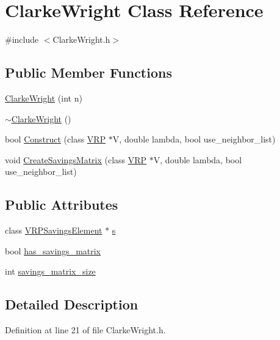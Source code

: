 \hypertarget{class_clarke_wright}{
\section{ClarkeWright Class Reference}
\label{class_clarke_wright}
}


{\ttfamily \#include $<$ClarkeWright.h$>$}

\subsection*{Public Member Functions}
\begin{DoxyCompactItemize}
\item 
\hyperlink{class_clarke_wright_af9e12768a9a93f76ab2b082b83b720ab}{ClarkeWright} (int n)
\item 
\hyperlink{class_clarke_wright_a156fd3e49d76865eb4653d243d5f2439}{$\sim$ClarkeWright} ()
\item 
bool \hyperlink{class_clarke_wright_ac99cbc055fc8f3210b0882c114858e3c}{Construct} (class \hyperlink{class_v_r_p}{VRP} $\ast$V, double lambda, bool use\_\-neighbor\_\-list)
\item 
void \hyperlink{class_clarke_wright_ab8dfbbf8b0b730fa7d851eabba9da1ac}{CreateSavingsMatrix} (class \hyperlink{class_v_r_p}{VRP} $\ast$V, double lambda, bool use\_\-neighbor\_\-list)
\end{DoxyCompactItemize}
\subsection*{Public Attributes}
\begin{DoxyCompactItemize}
\item 
class \hyperlink{class_v_r_p_savings_element}{VRPSavingsElement} $\ast$ \hyperlink{class_clarke_wright_a07187d146929ba5f529557d694897404}{s}
\item 
bool \hyperlink{class_clarke_wright_ac82ca0e8dc72b0a04a91786dcd4e6412}{has\_\-savings\_\-matrix}
\item 
int \hyperlink{class_clarke_wright_a9cff11194c4d3a21c589b8ff642a0e71}{savings\_\-matrix\_\-size}
\end{DoxyCompactItemize}


\subsection{Detailed Description}


Definition at line 21 of file ClarkeWright.h.




